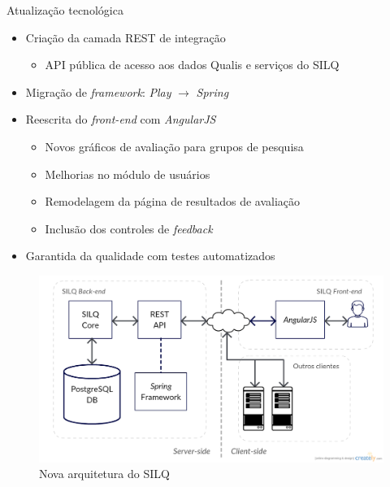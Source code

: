 \documentclass{beamer}
\begin{document}
\begin{frame}{Atualização tecnológica}
  \begin{itemize}
    \item Criação da camada REST de integração
    \begin{itemize}
      \item API pública de acesso aos dados Qualis e serviços do SILQ
    \end{itemize}
    \item Migração de \textit{framework}: \textit{Play} $\rightarrow$ \textit{Spring}
    \item Reescrita do \textit{front-end} com \textit{AngularJS}
    \begin{itemize}
      \item Novos gráficos de avaliação para grupos de pesquisa
      \item Melhorias no módulo de usuários
      \item Remodelagem da página de resultados de avaliação
      \item Inclusão dos controles de \textit{feedback}
    \end{itemize}
    \item Garantida da qualidade com testes automatizados
  \end{itemize}
\end{frame}

\begin{frame}
  \begin{figure}
    \includegraphics[width=\textwidth]{figuras/arquitetura-silq.png}
    \caption{Nova arquitetura do SILQ}
  \end{figure}
\end{frame}
\end{document}
